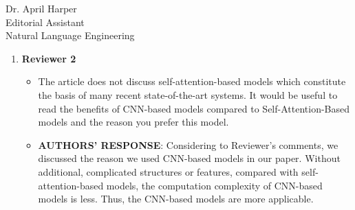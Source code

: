 \documentclass[11pt]{letter} %
\theoremstyle{definition}
\begin{document}
\begin{letter}{Dr. April Harper \\
            Editorial Assistant \\
			Natural Language Engineering}
\begin{enumerate}
\begin{itemize}
				According to the Reviewer's comments, we also discussed the factors that impact the covergence rate of the model with ATTF (Section 3.4) as follows:
				``
				The convergence rate of models with ATTF depends on three aspects:
				{\em dataset}, {\em basic model} and {\em experimental settings}.
				For {\em dataset}, ATTF redistributs the attention distribution between source documents and summaries during decoding,
				which dynamically searches the attended segment in source by the predicted segments in summary.
				Thus, the convergence rate of the models with ATTF depends on the length of source documets and summaries.
				The ATTF applied on better {\em basic models} converges faster,
				because better basic models learn the alignment between source documents and summaries better.
				The {\em experimental setting} also impacts the convergence rate of the model with ATTF.
				At the beginning of training, a large learning rate makes the model converge faster. 
				When most of the samples have been trained, 
				the model converges rapidly by decreasing the learning rate.
				''
				
				\item A minor suggestion is to rename the constant `sz` to something standard, say $beta$, etc.: the readers might get confused with the constant `s` and the latent variables `z`.
				\item[] \textbf{AUTHORS' RESPONSE}: 
				Considering the Reviewer's suggestion, 
				we renamed the constant 'sz' as $\beta$ in Section 2.2 and Section 3.2 as follows:
                \begin{itemize}
                \item[-] ``If the size of $P_{U_t}$ is larger than $\beta$, a predefined constant'' (Section 2.2)
                \item[-] ``We set the threshold $\beta$ to 3'' (Section 3.2)
                \end{itemize}


			\end{itemize}

			\item \textbf{Reviewer 2}
			\begin{itemize}
                \item The article does not discuss self-attention-based models which constitute the basis of many recent state-of-the-art systems. It would be useful to read the benefits of CNN-based models compared to Self-Attention-Based models and the reason you prefer this model.
				\item[] \textbf{AUTHORS' RESPONSE}: 
                Considering to Reviewer's comments, we discussed the reason we used CNN-based 
                models in our paper. 
                Without additional, complicated structures or features, 
                compared with self-attention-based models,
                the computation complexity of CNN-based models is less. 
                Thus, the CNN-based models are more applicable.


\end{itemize}
\end{enumerate}
\end{letter}
\end{document}

